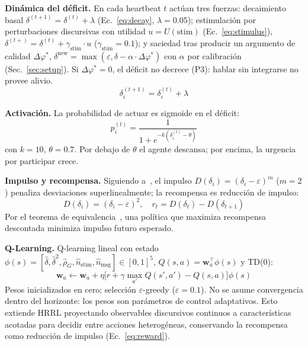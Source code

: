 \documentclass{llncs}
\begin{document}
\textbf{Din\'amica del d\'eficit.} En cada heartbeat $t$ act\'uan tres
fuerzas: decaimiento basal $\delta^{(t+1)}=\delta^{(t)}+\lambda$
(Ec.~\ref{eq:decay}, $\lambda{=}0.05$); estimulaci\'on por perturbaciones
discursivas con utilidad $u\!=\!U(\text{stim})$ (Ec.~\ref{eq:stimulus}),
$\delta^{(t+)} = \delta^{(t)} + \gamma_{\text{stim}}\cdot u$
($\gamma_{\text{stim}}{=}0.1$); y saciedad tras producir un argumento de
calidad $\Delta\varphi^*$,
$\delta^{\text{new}} = \max(\varepsilon, \delta - \alpha\cdot\Delta\varphi^*)$
con $\alpha$ por calibraci\'on (Sec.~\ref{sec:setup}). Si
$\Delta\varphi^*{=}0$, el d\'eficit no decrece (\textsc{P3}): hablar sin
integrarse no provee alivio.
\begin{equation}
    \delta_i^{(t+1)} = \delta_i^{(t)} + \lambda
    \label{eq:decay}
\end{equation}

\textbf{Activaci\'on.} La probabilidad de actuar es sigmoide en el
d\'eficit:
\begin{equation}
    p_i^{(t)} = \frac{1}{1 + e^{-k(\delta_i^{(t)} - \theta)}}
    \label{eq:sigmoid}
\end{equation}
con $k{=}10$, $\theta{=}0.7$. Por debajo de $\theta$ el agente descansa;
por encima, la urgencia por participar crece.

\textbf{Impulso y recompensa.} Siguiendo
a~\textcite{keramati2014homeostatic}, el impulso
$D(\delta_i)=(\delta_i-\varepsilon)^m$ ($m{=}2$) penaliza desviaciones
superlinealmente; la recompensa es reducci\'on de impulso:
\begin{equation}
    D(\delta_i) = (\delta_i - \varepsilon)^2, \quad
    r_t = D(\delta_t) - D(\delta_{t+1})
    \label{eq:reward}
\end{equation}
Por el teorema de equivalencia~\parencite{keramati2014homeostatic}, una
pol\'itica que maximiza recompensa descontada minimiza impulso futuro
esperado.

\textbf{Q-Learning.} Q-learning lineal con estado
$\phi(s)=[\hat\delta,\hat\delta^2,\hat\rho_G,\hat n_{\text{stim}},\hat n_{\text{msg}}]\!\in\![0,1]^5$,
$Q(s,a)=\mathbf{w}_a^\top \phi(s)$ y TD(0):
\begin{equation}
    \mathbf{w}_a \leftarrow \mathbf{w}_a + \eta \bigl[r + \gamma \max_{a'}
    Q(s', a') - Q(s, a)\bigr] \phi(s)
    \label{eq:td0}
\end{equation}
Pesos inicializados en cero; selecci\'on $\varepsilon$-greedy
($\varepsilon{=}0.1$). No se asume convergencia dentro del horizonte:
los pesos son par\'ametros de control adaptativos. Esto extiende HRRL
proyectando observables discursivos continuos a caracter\'isticas
acotadas para decidir entre acciones heterog\'eneas, conservando la
recompensa como reducci\'on de impulso (Ec.~\ref{eq:reward}).
\end{document}

